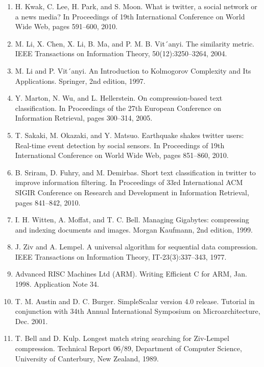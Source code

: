 \documentclass{article}
\begin{document}
\begin{enumerate}
	\item H. Kwak, C. Lee, H. Park, and S. Moon. What is
	twitter, a social network or a news media? In
	Proceedings of 19th International Conference on
	World Wide Web, pages 591–600, 2010.

	\item M. Li, X. Chen, X. Li, B. Ma, and P. M. B. Vit´anyi.
	The similarity metric. IEEE Transactions on
	Information Theory, 50(12):3250–3264, 2004.

	\item M. Li and P. Vit´anyi. An Introduction to Kolmogorov
	Complexity and Its Applications. Springer, 2nd
	edition, 1997.

	\item Y. Marton, N. Wu, and L. Hellerstein. On
	compression-based text classification. In Proceedings of
	the 27th European Conference on Information
	Retrieval, pages 300–314, 2005.
	
	\item T. Sakaki, M. Okazaki, and Y. Matsuo. Earthquake
	shakes twitter users: Real-time event detection by
	social sensors. In Proceedings of 19th International
	Conference on World Wide Web, pages 851–860, 2010.
	
	\item B. Sriram, D. Fuhry, and M. Demirbas. Short text
	classification in twitter to improve information
	filtering. In Proceedings of 33rd International ACM
	SIGIR Conference on Research and Development in
	Information Retrieval, pages 841–842, 2010.
	
	\item I. H. Witten, A. Moffat, and T. C. Bell. Managing
	Gigabytes: compressing and indexing documents and
	images. Morgan Kaufmann, 2nd edition, 1999.

	\item J. Ziv and A. Lempel. A universal algorithm for
	sequential data compression. IEEE Transactions on
	Information Theory, IT-23(3):337–343, 1977.
	
	\item Advanced RISC Machines Ltd (ARM). Writing Efficient
	C for ARM, Jan. 1998. Application Note 34.
	
	\item T. M. Austin and D. C. Burger. SimpleScalar version 4.0
	release. Tutorial in conjunction with 34th Annual International Symposium on Microarchitecture, Dec. 2001.
	
	\item T. Bell and D. Kulp. Longest match string searching for
	Ziv-Lempel compression. Technical Report 06/89, Department of Computer Science, University of Canterbury,
	New Zealand, 1989.
	

\end{enumerate}
\end{document}
